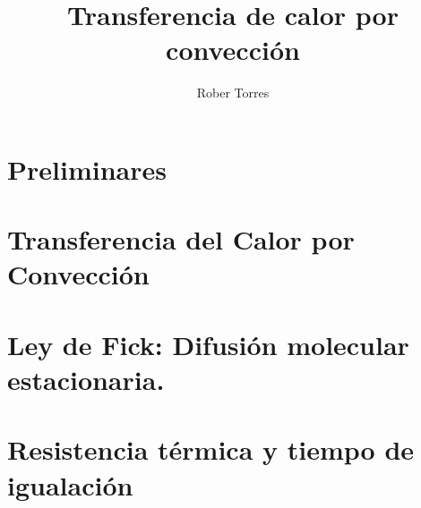 \documentclass[12pt]{article}
\title{Transferencia de calor por convección}
\author{Rober Torres}
\begin{document}
    \maketitle
    \section{Preliminares}
    

    \section{Transferencia del Calor por Convección}
    

    \section{Ley de Fick: Difusión molecular estacionaria.}
    
    
    \section{Resistencia térmica y tiempo de igualación}
    
    
    \printbibliography
\end{document}
